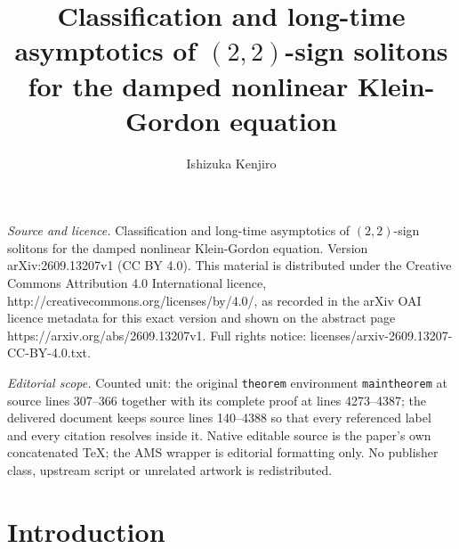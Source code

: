 \documentclass[10pt,a4paper]{amsart}
\numberwithin{equation}{section}
\begin{document}
\title[Classification and long-time asymptotics of (2,2)-sign solit]{Classification and long-time asymptotics of $(2,2)$-sign solitons for the damped nonlinear Klein-Gordon equation}
\author{Ishizuka Kenjiro}
\date{}
\maketitle
\noindent\emph{Source and licence.} Classification and long-time asymptotics of $(2,2)$-sign solitons for the damped nonlinear Klein-Gordon equation. Version arXiv:2609.13207v1 (CC BY 4.0). This material is distributed under the Creative Commons Attribution 4.0 International licence, http://creativecommons.org/licenses/by/4.0/, as recorded in the arXiv OAI licence metadata for this exact version and shown on the abstract page https://arxiv.org/abs/2609.13207v1. Full rights notice: licenses/arxiv-2609.13207-CC-BY-4.0.txt.\par\smallskip
\noindent\textit{Editorial scope.} Counted unit: the original \texttt{theorem} environment \texttt{maintheorem} at source lines 307--366 together with its complete proof at lines 4273--4387; the delivered document keeps source lines 140--4388 so that every referenced label and every citation resolves inside it. Native editable source is the paper's own concatenated TeX; the AMS wrapper is editorial formatting only. No publisher class, upstream script or unrelated artwork is redistributed.
\section{Introduction}
\end{document}
